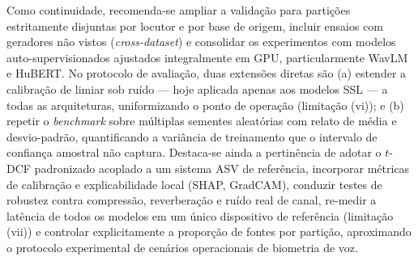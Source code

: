 \documentclass[12pt,a4paper]{article}
\begin{document}
Como continuidade, recomenda-se ampliar a validação para partições estritamente
disjuntas por locutor e por base de origem, incluir ensaios com geradores não
vistos (\textit{cross-dataset}) e consolidar os experimentos com modelos
auto-supervisionados ajustados integralmente em GPU, particularmente WavLM e
HuBERT. No protocolo de avaliação, duas extensões diretas são (a) estender a
calibração de limiar sob ruído --- hoje aplicada apenas aos modelos SSL ---
a todas as arquiteturas, uniformizando o ponto de operação (limitação (vi)); e
(b) repetir o \textit{benchmark} sobre múltiplas sementes aleatórias com
relato de média e desvio-padrão, quantificando a variância de treinamento que
o intervalo de confiança amostral não captura. Destaca-se ainda a pertinência
de adotar o $t$-DCF padronizado acoplado a um sistema ASV de referência,
incorporar métricas de calibração e explicabilidade local (SHAP, GradCAM),
conduzir testes de robustez contra compressão, reverberação e ruído real de
canal, re-medir a latência de todos os modelos em um único dispositivo de
referência (limitação (vii)) e controlar explicitamente a proporção de fontes
por partição, aproximando o protocolo experimental de cenários operacionais de
biometria de voz.



\newpage
\end{document}
